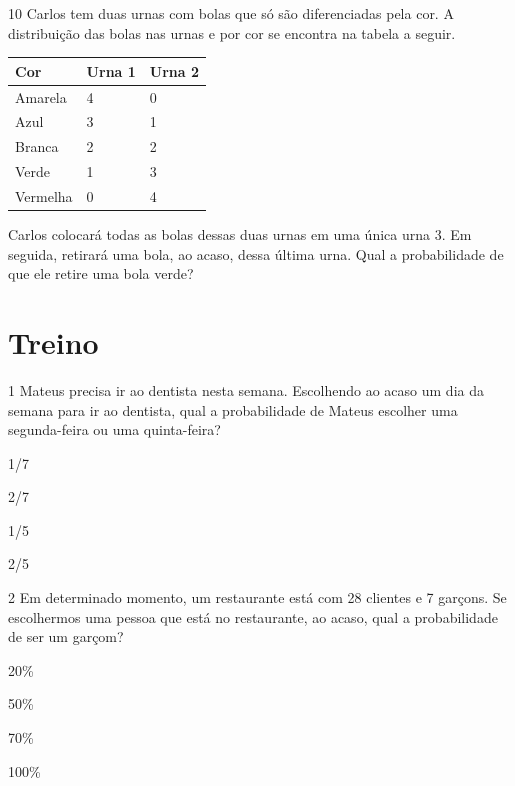 \begin{emptybox}
\vspace{2cm}
\end{emptybox}

\num{10} Carlos tem duas urnas com bolas que só são diferenciadas pela
cor. A distribuição das bolas nas urnas e por cor se encontra na tabela
a seguir.

\begin{longtable}[]{@{}lll@{}}
\toprule
Cor & Urna 1 & Urna 2\tabularnewline
\midrule
\endhead
Amarela & 4 & 0\tabularnewline
Azul & 3 & 1\tabularnewline
Branca & 2 & 2\tabularnewline
Verde & 1 & 3\tabularnewline
Vermelha & 0 & 4\tabularnewline
\bottomrule
\end{longtable}

Carlos colocará todas as bolas dessas duas urnas em uma única urna 3. Em
seguida, retirará uma bola, ao acaso, dessa última urna. Qual a
probabilidade de que ele retire uma bola verde?

\begin{emptybox}
\end{emptybox}

\pagebreak
\section*{Treino}

\num{1} Mateus precisa ir ao dentista nesta semana. Escolhendo ao acaso um
dia da semana para ir ao dentista, qual a probabilidade de Mateus
escolher uma segunda-feira ou uma quinta-feira?

\begin{escolha}
\item
  1/7
\item
  2/7
\item
  1/5
\item
  2/5
\end{escolha}


\num{2} Em determinado momento, um restaurante está com 28 clientes e 7
garçons. Se escolhermos uma pessoa que está no restaurante, ao acaso,
qual a probabilidade de ser um garçom?

\begin{escolha}
\item
  20\%
\item
  50\%
\item
  70\%
\item
  100\%
\end{escolha}



